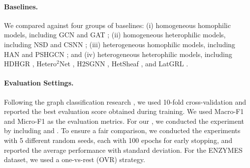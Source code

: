 \begin{table}[H]
  \centering
  \caption{Graph-classification dataset statistics. The N column indicates nodes, E indicates the number of edges, and C indicates classes.}
  \label{tab:graph-datasets}
  \small
\end{table}



\paragraph{Baselines.} We compared \method{} against four groups of baselines: (i) homogeneous homophilic models, including GCN \cite{kipf2017gcn} and GAT \cite{velickovic2018gat}; (ii) homogeneous heterophilic models, including NSD \cite{bodnar2022neural} and CSNN \cite{ribeiro2026cooperative}; (iii) heterogeneous homophilic models, including HAN \cite{wang2019han} and PSHGCN \cite{he2024spectral}; and (iv) heterogeneous heterophilic models, including HDHGR \cite{guo2023homophily}, Hetero$^2$Net \cite{li2025hetero2net}, H2SGNN \cite{lu2026addressing}, HetSheaf \cite{braithwaite2024heterogeneous}, and LatGRL \cite{shen2025heterophily}.

\paragraph{Evaluation Settings.} Following the graph classification research \cite{zhang2018end, amouzad2024graphunet}, we used 10-fold cross-validation and reported the best evaluation score obtained during training. We used Macro-F1 and Micro-F1 as the evaluation metrics. For our \method{}, we conducted the experiment by including \ampss{} and \sheafconvpool{}. To ensure a fair comparison, we conducted the experiments with 5 different random seeds, each with 100 epochs for early stopping, and reported the average performance with standard deviation. For the ENZYMES dataset, we used a one-vs-rest (OVR) strategy.

